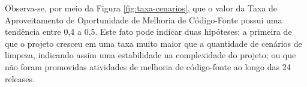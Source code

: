 Observa-se, por meio da Figura \ref{fig:taxa-cenarios}, que o valor da Taxa de Aproveitamento de Oportunidade de Melhoria de Código-Fonte possui uma tendência entre 0,4 a 0,5. Este fato pode indicar duas hipóteses: a primeira de que o projeto cresceu em uma taxa muito maior que a quantidade de cenários de limpeza, indicando assim uma estabilidade na complexidade do projeto; ou que não foram promovidas atividades de melhoria de código-fonte ao longo das 24 releases.
